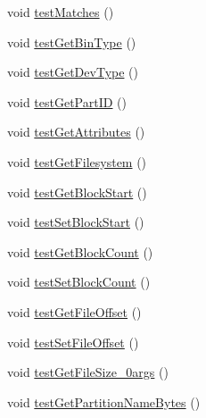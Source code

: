 \begin{DoxyCompactItemize}
\item 
void \hyperlink{class_c_a_s_u_a_l_1_1archiving_1_1libpit_1_1_pit_entry_test_ab5e344028098b63a416ee4190cb56b12}{test\-Matches} ()
\item 
void \hyperlink{class_c_a_s_u_a_l_1_1archiving_1_1libpit_1_1_pit_entry_test_a7d2be9f55ffd2fced394d7887bb898a5}{test\-Get\-Bin\-Type} ()
\item 
void \hyperlink{class_c_a_s_u_a_l_1_1archiving_1_1libpit_1_1_pit_entry_test_ab4411fb6e106a5fe0e7e59f82b1c368f}{test\-Get\-Dev\-Type} ()
\item 
void \hyperlink{class_c_a_s_u_a_l_1_1archiving_1_1libpit_1_1_pit_entry_test_a6a0b1f5e02bea82e46132f55c0c2c64f}{test\-Get\-Part\-I\-D} ()
\item 
void \hyperlink{class_c_a_s_u_a_l_1_1archiving_1_1libpit_1_1_pit_entry_test_a04d85e4ce7961e30770d9e3182be1dbb}{test\-Get\-Attributes} ()
\item 
void \hyperlink{class_c_a_s_u_a_l_1_1archiving_1_1libpit_1_1_pit_entry_test_af2b68a8e0381598e33ecde1a55adbd52}{test\-Get\-Filesystem} ()
\item 
void \hyperlink{class_c_a_s_u_a_l_1_1archiving_1_1libpit_1_1_pit_entry_test_a699b6584b6da8b1f870503c62d4d2028}{test\-Get\-Block\-Start} ()
\item 
void \hyperlink{class_c_a_s_u_a_l_1_1archiving_1_1libpit_1_1_pit_entry_test_abe6d7ef846f873447a48f0aec12ad52b}{test\-Set\-Block\-Start} ()
\item 
void \hyperlink{class_c_a_s_u_a_l_1_1archiving_1_1libpit_1_1_pit_entry_test_aafe49e1d9dcff3a1f9b0fcb9fc40600f}{test\-Get\-Block\-Count} ()
\item 
void \hyperlink{class_c_a_s_u_a_l_1_1archiving_1_1libpit_1_1_pit_entry_test_a92506f499e25001923a5943b937138c1}{test\-Set\-Block\-Count} ()
\item 
void \hyperlink{class_c_a_s_u_a_l_1_1archiving_1_1libpit_1_1_pit_entry_test_a99f2303ffe21405112a6a0189858ce24}{test\-Get\-File\-Offset} ()
\item 
void \hyperlink{class_c_a_s_u_a_l_1_1archiving_1_1libpit_1_1_pit_entry_test_a0b4c156a55f261660151eb2574c1b6e3}{test\-Set\-File\-Offset} ()
\item 
void \hyperlink{class_c_a_s_u_a_l_1_1archiving_1_1libpit_1_1_pit_entry_test_a23d094eb684ad446e43f8fc481094e0f}{test\-Get\-File\-Size\-\_\-0args} ()
\item 
void \hyperlink{class_c_a_s_u_a_l_1_1archiving_1_1libpit_1_1_pit_entry_test_ad65cfab0db84145d602e044ebe70c38d}{test\-Get\-Partition\-Name\-Bytes} ()

\end{DoxyCompactItemize}
